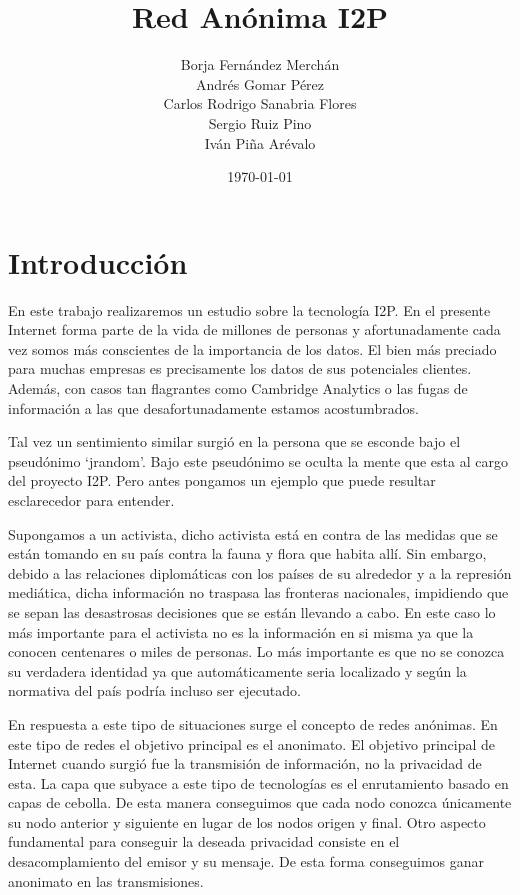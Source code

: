 \documentclass{article}
\title{Red Anónima I2P}
\author{Borja Fernández Merchán \\ Andrés Gomar Pérez \\ Carlos Rodrigo Sanabria Flores \\ Sergio Ruiz Pino
 \\ Iván Piña Arévalo}
\date{\today}
\begin{document}
\maketitle

\section{Introducción}
En este trabajo realizaremos un estudio sobre la tecnología I2P. En el presente Internet forma parte de la vida 
de millones de personas y afortunadamente cada vez somos más conscientes de la importancia de los datos. El bien 
más preciado para muchas empresas es precisamente los datos de sus potenciales clientes. Además, con casos tan 
flagrantes como Cambridge Analytics o las fugas de información a las que desafortunadamente estamos acostumbrados. 

Tal vez un sentimiento similar surgió en la persona que se esconde bajo el pseudónimo ‘jrandom’. Bajo este 
pseudónimo se oculta la mente que esta al cargo del proyecto I2P. Pero antes pongamos un ejemplo que puede resultar 
esclarecedor para entender.

Supongamos a un activista, dicho activista está en contra de las medidas que se están tomando en su país contra 
la fauna y flora que habita allí. Sin embargo, debido a las relaciones diplomáticas con los países de su alrededor
y a la represión mediática, dicha información no traspasa las fronteras nacionales, impidiendo que se sepan las desastrosas 
decisiones que se están llevando a cabo. En este caso lo más importante para el activista no es la información en si misma 
ya que la conocen centenares o miles de personas. Lo más importante es que no se conozca su verdadera identidad ya que 
automáticamente seria localizado y según la normativa del país podría incluso ser ejecutado. 

En respuesta a este tipo de situaciones surge el concepto de redes anónimas. En este tipo de redes el objetivo principal es 
el anonimato. El objetivo principal de Internet cuando surgió fue la transmisión de información, no la privacidad de esta. La 
capa que subyace a este tipo de tecnologías es el enrutamiento basado en capas de cebolla. De esta manera conseguimos que cada 
nodo conozca únicamente su nodo anterior y siguiente en lugar de los nodos origen y final. Otro aspecto fundamental para conseguir 
la deseada privacidad consiste en el desacomplamiento del emisor y su mensaje. De esta forma conseguimos ganar anonimato en las 
transmisiones. 
\end{document}
